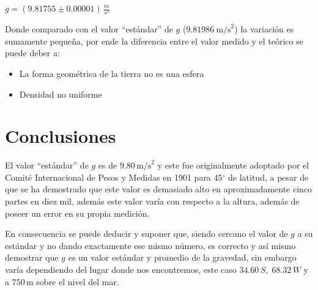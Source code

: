 \documentclass[a4paper,twocolumn]{article}
\begin{document}
\begin{center}
    \begin{large}
        $g=(9.81755 \pm 0.00001)\,\frac{m}{s^{2}}$
    \end{large}
\end{center}

Donde comparado con el valor ``estándar'' de $g$ ($9.81986~\mathrm{m/s}^{2}$)\cite{b4} la variación es sumamente pequeña, por ende la diferencia entre el valor medido y el teórico se puede deber a:

\begin{itemize}
    \item La forma geométrica de la tierra no es una esfera\cite{b11}
    \item Densidad no uniforme~\cite{b11}
\end{itemize}

\section{Conclusiones}

El valor ``estándar'' de $g$ es de $9.80\,\mathrm{m/s}^{2}$ y este fue originalmente adoptado por el Comité Internacional de Pesos y Medidas en 1901\cite{b9} para 45$^\circ$ de latitud, a pesar de que se ha demostrado que este valor es demasiado alto en aproximadamente cinco partes en diez mil\cite{b9}, además este valor varía con respecto a la altura, además de poseer un error en su propia medición.

En consecuencia se puede deducir y suponer que, siendo cercano el valor de $g$ a su estándar y no dando exactamente ese mismo número, es correcto y así mismo demostrar que $g$ es un valor estándar y promedio de la gravedad, sin embargo varía dependiendo del lugar donde nos encontremos, este caso $34.60\,S,\;68.32\,W$ y a $750\,\mathrm{m}$ sobre el nivel del mar.

\end{document}

